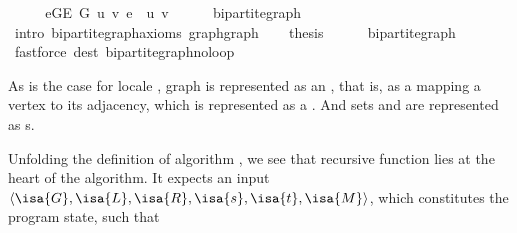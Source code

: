\begin{isabellebody}
\endisataginvisible
{\isafoldinvisible}%
%
\isadeliminvisible
\isanewline
%
\endisadeliminvisible
%
\isadelimproof
%
\endisadelimproof
%
\isatagproof
{}\isamarkupfalse%
\ {\isacharminus}{\kern0pt}\isanewline
\ \ \isamarkupfalse%
\ {\isachardoublequoteopen}{\isasymforall}e{\isasymin}G{\isachardot}{\kern0pt}E\ G{\isachardot}{\kern0pt}\ {\isasymexists}u\ v{\isachardot}{\kern0pt}\ e\ {\isacharequal}{\kern0pt}\ {\isacharbraceleft}{\kern0pt}u{\isacharcomma}{\kern0pt}\ v{\isacharbraceright}{\kern0pt}{\isachardoublequoteclose}\isanewline
\ \ \ \ \isamarkupfalse%
\ bipartite{\isacharunderscore}{\kern0pt}graph\isanewline
\ \ \ \ \isamarkupfalse%
\ {\isacharparenleft}{\kern0pt}intro\ bipartite{\isacharunderscore}{\kern0pt}graph{\isachardot}{\kern0pt}axioms{\isacharparenleft}{\kern0pt}{}{\isacharparenright}{\kern0pt}\ graph{\isachardot}{\kern0pt}graph{\isacharparenright}{\kern0pt}\isanewline
\ \ \isamarkupfalse%
\ {\isacharquery}{\kern0pt}thesis\isanewline
\ \ \ \ \isamarkupfalse%
\ bipartite{\isacharunderscore}{\kern0pt}graph\isanewline
\ \ \ \ \isamarkupfalse%
\ {\isacharparenleft}{\kern0pt}fastforce\ dest{\isacharcolon}{\kern0pt}\ bipartite{\isacharunderscore}{\kern0pt}graph{\isachardot}{\kern0pt}no{\isacharunderscore}{\kern0pt}loop{\isacharparenright}{\kern0pt}\isanewline
{}\isamarkupfalse%
%
\endisatagproof
{\isafoldproof}%
%
\isadelimproof
%
\endisadelimproof
%
\begin{isamarkuptext}%
As is the case for locale , graph  is represented as an
, that is, as a  mapping a vertex to its adjacency, which
is represented as a . And sets  and  are represented as
s.%
\end{isamarkuptext}\isamarkuptrue%
%
\isadelimdocument
%
\endisadelimdocument
%
\isatagdocument
%
\isamarkuptrue%
%
\endisatagdocument
{\isafolddocument}%
%
\isadelimdocument
%
\endisadelimdocument
%
\begin{isamarkuptext}%
Unfolding the definition of algorithm , we see that recursive
function  lies at the heart of the algorithm. It expects an input
$\langle \isa{G},\isa{L},\isa{R},\isa{s},\isa{t},\isa{M}\rangle$, which constitutes the
program state, such that


\end{isamarkuptext}
\end{isabellebody}
